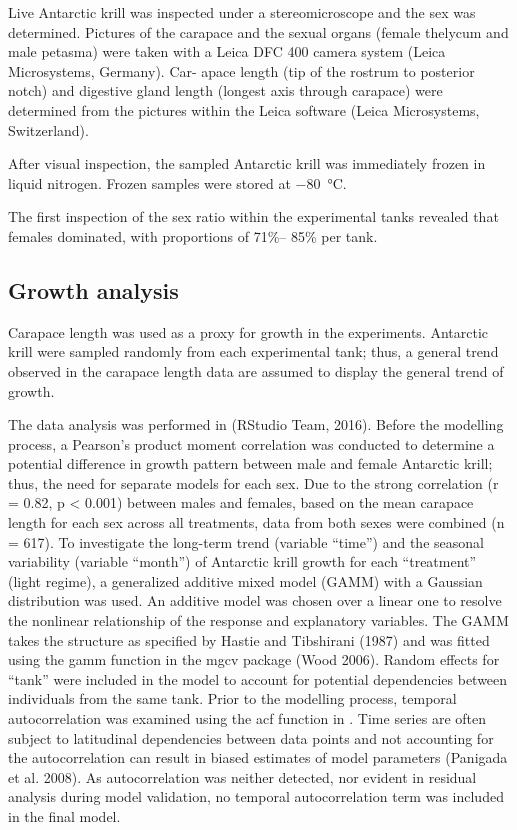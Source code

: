 Live Antarctic krill was inspected under a stereomicroscope and the sex was
determined. Pictures of the carapace and the sexual organs (female thelycum and
male petasma) were taken with a Leica DFC 400 camera system (Leica
Microsystems, Germany). Car- apace length (tip of the rostrum to posterior
notch) and digestive gland length (longest axis through carapace) were
determined from the pictures within the Leica  software
 (Leica Microsystems, Switzerland). 

After visual inspection, the sampled Antarctic krill was immediately frozen in
liquid nitrogen. Frozen samples were stored at \SI{-80}{\celsius}.

The first inspection of the sex ratio within the experimental tanks revealed
that females dominated, with proportions of 71\%– 85\% per tank. 

\subsection{Growth analysis} 

Carapace length was used as a proxy for growth in the experiments. Antarctic
krill were sampled randomly from each experimental tank; thus, a general trend
observed in the carapace length data are assumed to display the general trend
of growth. 

The data analysis was performed in  (RStudio Team,
2016). Before the modelling process, a Pearson’s product moment correlation was
conducted to determine a potential difference in growth pattern between male
and female Antarctic krill; thus, the need for separate models for each sex.
Due to the strong correlation (r = 0.82, p < 0.001) between males and females,
based on the mean carapace length for each sex across all treatments, data from
both sexes were combined (n = 617). To investigate the long-term trend
(variable “time”) and the seasonal variability (variable “month”) of Antarctic
krill growth for each “treatment” (light regime), a generalized additive mixed
model (GAMM) with a Gaussian distribution was used. An additive model was
chosen over a linear one to resolve the nonlinear relationship of the response
and explanatory variables. The GAMM takes the structure as specified by Hastie
and Tibshirani (1987) and was fitted using the gamm function in the mgcv
package (Wood 2006). Random effects for “tank” were included in the model to
account for potential dependencies between individuals from the same tank.
Prior to the modelling process, temporal autocorrelation was examined using the
acf function in . Time series are often subject to latitudinal
dependencies between data points and not accounting for the autocorrelation can
result in biased estimates of model parameters (Panigada et al. 2008). As
autocorrelation was neither detected, nor evident in residual analysis during
model validation, no temporal autocorrelation term was included in the final
model. 

